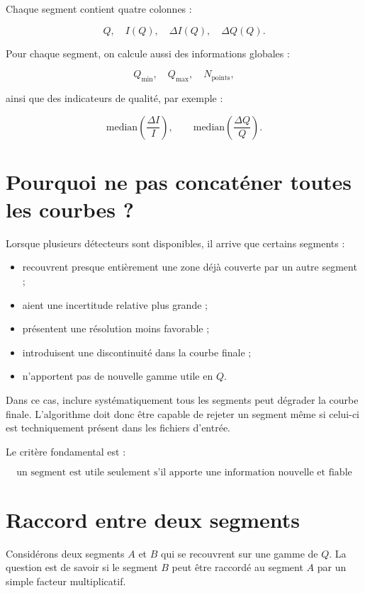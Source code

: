 \documentclass[11pt,a4paper]{article}
\begin{document}
Chaque segment contient quatre colonnes :

\[
    Q,\quad I(Q),\quad \Delta I(Q),\quad \Delta Q(Q).
\]

Pour chaque segment, on calcule aussi des informations globales :

\[
    Q_{\min},\quad Q_{\max},\quad N_{\mathrm{points}},
\]

ainsi que des indicateurs de qualité, par exemple :

\[
    \mathrm{median}\left(\frac{\Delta I}{I}\right),
    \qquad
    \mathrm{median}\left(\frac{\Delta Q}{Q}\right).
\]

\section{Pourquoi ne pas concaténer toutes les courbes ?}

Lorsque plusieurs détecteurs sont disponibles, il arrive que certains segments :

\begin{itemize}[leftmargin=1.5em]
    \item recouvrent presque entièrement une zone déjà couverte par un autre
    segment ;
    \item aient une incertitude relative plus grande ;
    \item présentent une résolution moins favorable ;
    \item introduisent une discontinuité dans la courbe finale ;
    \item n'apportent pas de nouvelle gamme utile en $Q$.
\end{itemize}

Dans ce cas, inclure systématiquement tous les segments peut dégrader la courbe
finale. L'algorithme doit donc être capable de rejeter un segment même si celui-ci
est techniquement présent dans les fichiers d'entrée.

Le critère fondamental est :

\[
\boxed{
    \text{un segment est utile seulement s'il apporte une information nouvelle
    et fiable}
}
\]

\section{Raccord entre deux segments}

Considérons deux segments $A$ et $B$ qui se recouvrent sur une gamme de $Q$.
La question est de savoir si le segment $B$ peut être raccordé au segment $A$
par un simple facteur multiplicatif.
\end{document}
